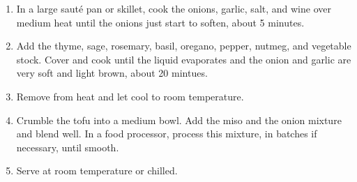 
\begin{ingredients}
\end{ingredients}


\begin{recipe}
  \begin{enumerate}

  \item In a large saut\'e pan or skillet, cook the onions, garlic,
    salt, and wine over medium heat until the onions just start to
    soften, about 5 minutes.

  \item Add the thyme, sage, rosemary, basil, oregano, pepper, nutmeg,
    and vegetable stock.  Cover and cook until the liquid evaporates
    and the onion and garlic are very soft and light brown, about 20
    mintues.

  \item Remove from heat and let cool to room temperature.

  \item Crumble the tofu into a medium bowl.  Add the miso and the
    onion mixture and blend well.  In a food processor, process this
    mixture, in batches if necessary, until smooth.

  \item Serve at room temperature or chilled.

  \end{enumerate}
\end{recipe}
